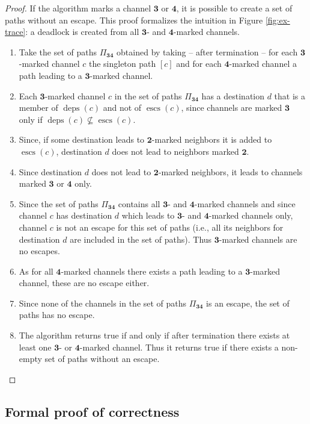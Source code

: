 \documentclass[submission,copyright]{eptcs}
\DeclareMathOperator{\escs}{escs}
\DeclareMathOperator{\deps}{deps}
\begin{document}
\begin{proof}
If the algorithm marks a channel $\mathbf{3}$ or $\mathbf{4}$, it is possible to create a set of paths without an escape. This proof formalizes the intuition in Figure \ref{fig:ex-trace}: a deadlock is created from all $\mathbf{3}$- and $\mathbf{4}$-marked channels. 
\begin{enumerate}
\item Take the set of paths $\Pi_\mathbf{34}$ obtained by taking -- after termination -- for each $\mathbf{3}$-marked channel $c$ the singleton path $[c]$ and for each $\mathbf{4}$-marked channel a path leading to a $\mathbf{3}$-marked channel.
\item Each $\mathbf{3}$-marked channel $c$ in the set of paths $\Pi_\mathbf{34}$ has a destination $d$ that is a member of $\deps(c)$ and not of $\escs(c)$, since channels are marked $\mathbf{3}$ only if $\deps(c) \nsubseteq \escs(c)$.
\item Since, if some destination leads to $\mathbf{2}$-marked neighbors it is added to $\escs(c)$, destination $d$ does not lead to neighbors marked $\mathbf{2}$.
\item Since destination $d$ does not lead to $\mathbf{2}$-marked neighbors, it leads to channels marked $\mathbf{3}$ or $\mathbf{4}$ only.
\item Since the set of paths $\Pi_\mathbf{34}$ contains all $\mathbf{3}$- and $\mathbf{4}$-marked channels and since channel $c$ has destination $d$ which leads to $\mathbf{3}$- and $\mathbf{4}$-marked channels only, channel $c$ is not an escape for this set of paths (i.e., all its neighbors for destination $d$ are included in the set of paths). Thus $\mathbf{3}$-marked channels are no escapes.
\item As for all $\mathbf{4}$-marked channels there exists a path leading to a $\mathbf{3}$-marked channel, these are no escape either.
\item Since none of the channels in the set of paths $\Pi_\mathbf{34}$ is an escape, the set of paths has no escape.
\item The algorithm returns true if and only if after termination there exists at least one $\mathbf{3}$- or $\mathbf{4}$-marked channel. Thus it returns true if there exists a non-empty set of paths without an escape.
\end{enumerate}
\end{proof}

\subsection{Formal proof of correctness}
\end{document}
